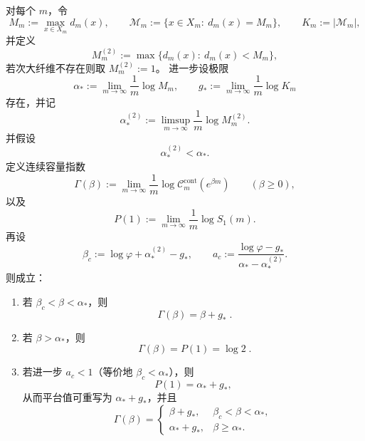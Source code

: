 \begin{theorem}\label{thm:xi-high-budget-continuous-capacity-linear-plateau}
对每个 \(m\)，令
\[
M_m:=\max_{x\in X_m}d_m(x),
\qquad
\mathcal M_m:=\{x\in X_m:\ d_m(x)=M_m\},
\qquad
K_m:=|\mathcal M_m|,
\]
并定义
\[
M_m^{(2)}:=\max\{d_m(x):\ d_m(x)<M_m\},
\]
若次大纤维不存在则取 \(M_m^{(2)}:=1\)。
进一步设极限
\[
\alpha_\ast:=\lim_{m\to\infty}\frac{1}{m}\log M_m,
\qquad
g_\ast:=\lim_{m\to\infty}\frac{1}{m}\log K_m
\]
存在，并记
\[
\alpha_\ast^{(2)}:=\limsup_{m\to\infty}\frac{1}{m}\log M_m^{(2)}.
\]
并假设
\[
\alpha_\ast^{(2)}<\alpha_\ast.
\]
定义连续容量指数
\[
\Gamma(\beta):=\lim_{m\to\infty}\frac{1}{m}\log \mathcal C_m^{\mathrm{cont}}(e^{\beta m})
\qquad(\beta\ge 0),
\]
以及
\[
P(1):=\lim_{m\to\infty}\frac{1}{m}\log S_1(m).
\]
再设
\[
\beta_c:=\log\varphi+\alpha_\ast^{(2)}-g_\ast,
\qquad
a_c:=\frac{\log\varphi-g_\ast}{\alpha_\ast-\alpha_\ast^{(2)}}.
\]
则成立：
\begin{enumerate}
  \item 若 \(\beta_c<\beta<\alpha_\ast\)，则
  \[
  \boxed{\;
  \Gamma(\beta)=\beta+g_\ast\; }.
  \]
  \item 若 \(\beta>\alpha_\ast\)，则
  \[
  \boxed{\;
  \Gamma(\beta)=P(1)=\log 2\; }.
  \]
  \item 若进一步 \(a_c<1\)（等价地 \(\beta_c<\alpha_\ast\)），则
  \[
  P(1)=\alpha_\ast+g_\ast,
  \]
  从而平台值可重写为 \(\alpha_\ast+g_\ast\)，并且
  \[
  \boxed{\;
  \Gamma(\beta)=
  \begin{cases}
  \beta+g_\ast,& \beta_c<\beta<\alpha_\ast,\\[2mm]
  \alpha_\ast+g_\ast,& \beta\ge \alpha_\ast.
  \end{cases}\;}
  \]
\end{enumerate}
\end{theorem}
